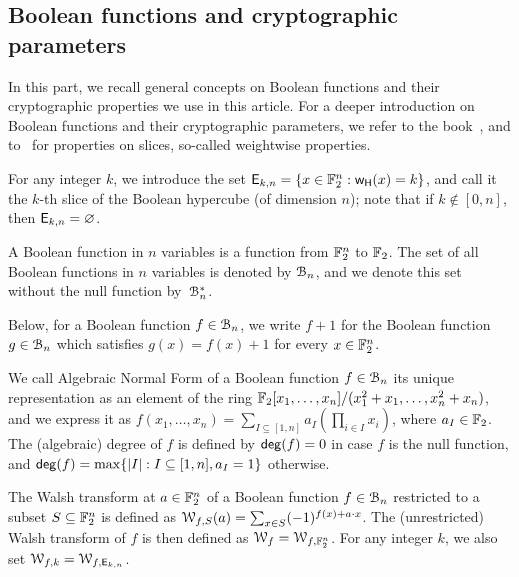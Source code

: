 \documentclass{llncs}
\begin{document}
\subsection{Boolean functions and cryptographic parameters}

In this part, we recall general concepts on Boolean functions and their cryptographic properties we use in this article. For a deeper introduction on Boolean functions and their cryptographic parameters, we refer to the book~\cite{Carlet20}, and to~\cite{TOSC:CarMeaRot17} for properties on slices, so-called weightwise properties.

\begin{definition}[Slice]
    For any integer $k$, we introduce the set $\mathsf{E}_{k,n}=\{x\in \mathbb{F}_2^n:\mathsf{w_H}(x)=k\}$, and call it the $k$-th slice of the Boolean hypercube (of dimension $n$); note that if $k\not\in[0,n]$, then $\mathsf{E}_{k,n}=\varnothing$.
\end{definition}

\begin{definition}\label{def:bool_f}
	A Boolean function in $n$ variables is a function from $\mathbb{F}_2^n$ to $\mathbb{F}_2$. The set of all Boolean functions in $n$ variables is denoted by $\mathcal{B}_n$, and we denote this set without the null function by~$\mathcal{B}_n^*$.
\end{definition}

Below, for a Boolean function $f\in\mathcal{B}_n$, we write $f+1$ for the Boolean function $g\in\mathcal{B}_n$ which satisfies $g(x)=f(x)+1$ for every $x\in\mathbb{F}_2^n$.

\begin{definition}\label{def:anf}
	We call Algebraic Normal Form of a Boolean function $f\in\mathcal{B}_n$ its unique representation as an element of the ring $\mathbb{F}_2[x_1,\dots,x_n]/(x_1^2+x_1,\dots,x_n^2+x_n)$, and we express it as $f(x_1,\dots,x_n)= \sum_{I \subseteq [1,n]} a_I \left( \prod_{i \in I} x_i \right)$, where $a_I\in \mathbb{F}_2$. The (algebraic) degree of $f$ is defined by $\mathsf{deg}(f)=0$ in case $f$ is the null function, and $\mathsf{deg}(f)=\max\{ |I|:I\subseteq[1,n],a_I=1\}$ otherwise.
\end{definition}

\begin{definition}\label{def:walsh_transform}
	The Walsh transform at $a \in \mathbb{F}_2^n$ of a Boolean function $f\in\mathcal{B}_n$ restricted to a subset $S\subseteq \mathbb{F}_2^n$ is defined as $\mathcal W_{f,S} (a) = \sum_{x\in S} (-1)^{f(x)+a \cdot x}$. The (unrestricted) Walsh transform of $f$ is then defined as $\mathcal W_{f}=\mathcal W_{f,\mathbb{F}_2^n}$. For any integer $k$, we also set $\mathcal W_{f,k}=\mathcal W_{f,\mathsf{E}_{k,n}}$.
\end{definition}
\end{document}
